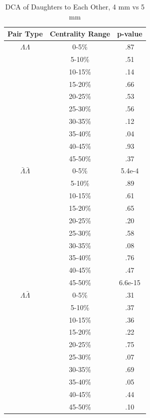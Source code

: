 \begin{table}
\begin{minipage}{18pc}
\caption {DCA of Daughters to Each Other, 4 mm vs 5 mm} \label{tab:DcaDaughtersEachOtherPvalueTests4mmVs5mm}
\begin{center}
\begin{tabular}{| c | c | c |}
  \hline                       
  Pair Type & Centrality Range & p-value \\
  \hline
  $\Lambda\Lambda$ & 0-5\% & .87 \\
   & 5-10\%  & .51 \\
   & 10-15\% & .14 \\
   & 15-20\% & .66 \\
   & 20-25\% & .53 \\
   & 25-30\% & .56 \\
   & 30-35\% & .12 \\
   & 35-40\% & .04 \\
   & 40-45\% & .93 \\
   & 45-50\% & .37 \\
   \hline
  $\bar{\Lambda}\bar{\Lambda}$ &  0-5\% & 5.4e-4 \\
   & 5-10\% & .89 \\
   & 10-15\% & .61 \\
   & 15-20\% & .65 \\
   & 20-25\% & .20 \\
   & 25-30\% & .58 \\
   & 30-35\% & .08 \\
   & 35-40\% & .76 \\
   & 40-45\% & .47 \\
   & 45-50\% & 6.6e-15 \\
   \hline
  $\Lambda\bar{\Lambda}$ &  0-5\% & .31 \\
   & 5-10\% & .37 \\
   & 10-15\% & .36 \\
   & 15-20\% & .22 \\
   & 20-25\% & .75 \\
   & 25-30\% & .07 \\
   & 30-35\% & .69 \\
   & 35-40\% & .05 \\
   & 40-45\% & .44 \\
   & 45-50\% & .10 \\
  \hline  
\end{tabular}
\end{center}
\end{minipage}
\end{table}


